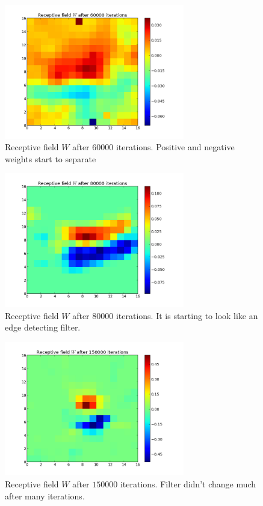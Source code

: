 \begin{figure}[h]
\centering
\includegraphics[width=0.7\textwidth]{../ex3/results1/img07}
\caption{Receptive field $W$ after $60000$ iterations. Positive and negative
weights start to separate}
\label{fig:img07}
\end{figure}

\begin{figure}[h]
\centering
\includegraphics[width=0.7\textwidth]{../ex3/results1/img09}
\caption{Receptive field $W$ after $80000$ iterations. It is starting to look
like an edge detecting filter.}
\label{fig:img09}
\end{figure}

\begin{figure}[h]
\centering
\includegraphics[width=0.7\textwidth]{../ex3/results1/img16}
\caption{Receptive field $W$ after $150000$ iterations. Filter didn't change
much after many iterations.}
\label{fig:img16}
\end{figure}

